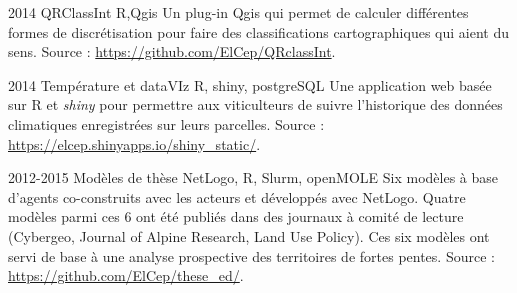 \documentclass[]{cv-etienne}
\begin{document}
\begin{entrylist}
\entry
{2014}
{QRClassInt}
{R,Qgis}
{
Un plug-in Qgis qui permet de calculer différentes formes de discrétisation pour faire des classifications cartographiques qui aient du sens.  Source : \url{https://github.com/ElCep/QRclassInt}.
}
\end{entrylist}
\begin{entrylist}
\entry
{2014}
{Température et dataVIz}
{R, shiny, postgreSQL}
{
Une application web basée sur R et \textit{shiny} pour permettre aux viticulteurs de suivre l'historique des données climatiques enregistrées sur leurs parcelles. Source : \url{https://elcep.shinyapps.io/shiny_static/}.
}
\end{entrylist}
\begin{entrylist}
\entry
{2012-2015}
{Modèles de thèse}
{NetLogo, R, Slurm, openMOLE}
{
Six modèles à base d'agents co-construits avec les acteurs et développés avec NetLogo. Quatre modèles parmi ces 6 ont été publiés dans des journaux à comité de lecture (Cybergeo, Journal of Alpine Research, Land Use Policy). Ces six modèles ont servi de base à une analyse prospective des territoires de fortes pentes.  Source : \url{https://github.com/ElCep/these_ed/}.
}
\end{entrylist}
\end{document}
